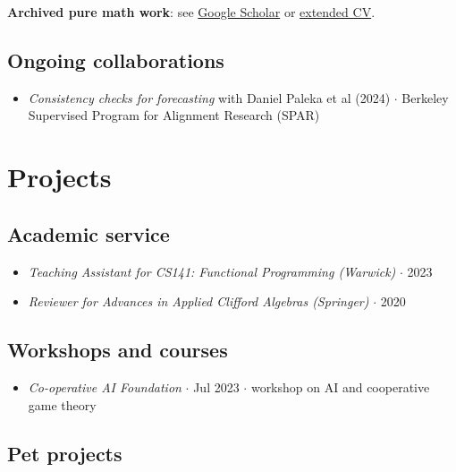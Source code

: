 \documentclass{article}
\begin{document}
\textbf{Archived pure math work}: see \href{https://scholar.google.co.in/citations?user=lb38BjYAAAAJ&hl=en}{Google Scholar} or \href{https://drive.google.com/file/d/1_VStBkw6DthYNyp4F3Xx2THInWLpNrHK/view?usp=drive_link}{extended CV}.

\subsection*{Ongoing collaborations}

\begin{itemize}
    
    \item \emph{Consistency checks for forecasting} with Daniel Paleka et al (2024) $\cdot$ Berkeley Supervised Program for Alignment Research (SPAR)

\end{itemize}

\section*{Projects}

\subsection*{Academic service}

\begin{itemize}

    \item \emph{Teaching Assistant for CS141: Functional Programming (Warwick)} $\cdot$ 2023
    
    \item \emph{Reviewer for Advances in Applied Clifford Algebras (Springer)} $\cdot$ 2020

\end{itemize}

\subsection*{Workshops and courses}

\begin{itemize}

    \item \emph{Co-operative AI Foundation} $\cdot$ Jul 2023 $\cdot$ workshop on AI and cooperative game theory

\end{itemize}

\subsection*{Pet projects}
\end{document}
